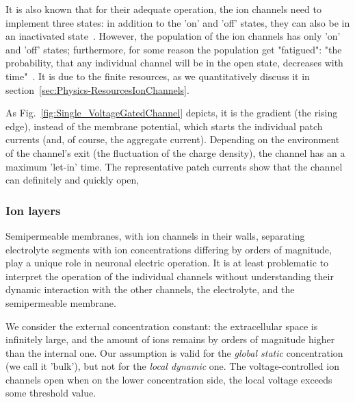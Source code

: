 It is also known that  for their adequate operation, the ion channels need to implement
three states: in addition to the 'on' and 'off' states, they can also be in an inactivated
state~\cite{ThreeStateUnidirectional:2004, MarkovianIonChannel:2005}.
However, the population of the ion channels has only 'on' and 'off' states;
furthermore, for some reason the population get "fatigued":
"the probability, that any individual channel
will be in the open state, decreases with time"~\cite{MolecularBiology:2002}. 
It is due to the finite resources, as we quantitatively discuss it in section~\ref{sec:Physics-ResourcesIonChannels}.


As Fig.~\ref{fig:Single_VoltageGatedChannel} depicts, it is the gradient (the rising edge), 
instead of the membrane potential, which 
starts the individual patch currents (and, of course, 
the aggregate current).
Depending on the environment of the channel's exit (the fluctuation
of the charge density), the channel has an a maximum 'let-in' time.
The representative patch currents show that the channel can definitely 
and quickly open, 


\subsubsection{Ion layers\label{sec:Physics-IonLayers}}

Semipermeable membranes, with ion channels in their walls, separating electrolyte segments with ion concentrations differing by orders of magnitude,  play a unique role in neuronal electric operation.
It is at least problematic to interpret the operation of the individual channels without understanding their dynamic
interaction with the other channels, the electrolyte, and the semipermeable membrane. 

We consider the external concentration constant: the extracellular
space is infinitely large, and the amount of ions remains by orders
of magnitude higher than the internal one. Our assumption is valid for the \textit{global static} concentration (we call it 'bulk'), but not for the \textit{local dynamic} one.
The voltage-controlled ion channels open when
on the lower concentration side, the local voltage exceeds some threshold value.

